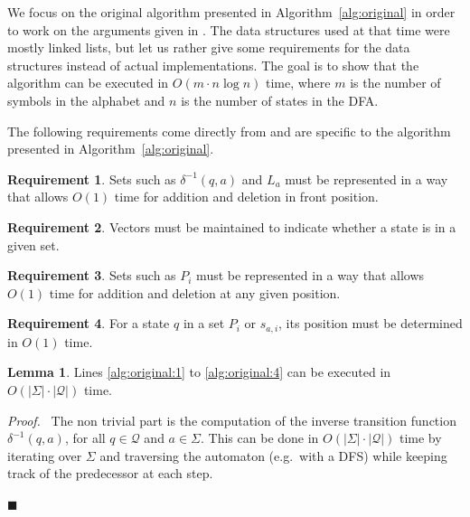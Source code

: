 \documentclass[12pt, a4 paper]{article}
\renewenvironment{proof}[1][Proof]{\begin{mdframed}[backgroundcolor=black!5, topline=false, rightline=false, bottomline=false, linecolor=black!15, linewidth=3pt]{\noindent\textit{#1.}\ }}{\noindent\par\hfill$\blacksquare$\end{mdframed}}
\theoremstyle{definition}
\newtheorem{lemma}{Lemma}
\newtheorem{requirement}{Requirement}
\begin{document}
We focus on the original algorithm presented in Algorithm~\ref{alg:original} in order to work on the arguments given in \cite{Hop71}. The data structures used at that time were mostly linked lists, but let us rather give some requirements for the data structures instead of actual implementations. The goal is to show that the algorithm can be executed in $O(m \cdot n \log n)$ time, where $m$ is the number of symbols in the alphabet and $n$ is the number of states in the DFA.

The following requirements come directly from \cite{Hop71} and are specific to the algorithm presented in Algorithm~\ref{alg:original}.

\begin{requirement}
    \label{req:1}
Sets such as $\delta^{-1}(q, a)$ and $L_a$ must be represented in a way that allows $O(1)$ time for addition and deletion in front position.
\end{requirement}

\begin{requirement}
    \label{req:2}
Vectors must be maintained to indicate whether a state is in a given set.
\end{requirement}

\begin{requirement}
    \label{req:3}
Sets such as $P_i$ must be represented in a way that allows $O(1)$ time for addition and deletion at any given position.
\end{requirement}

\begin{requirement}
    \label{req:4}
For a state $q$ in a set $P_i$ or $s_{a,i}$, its position must be determined in $O(1)$ time.
\end{requirement}

\begin{lemma}
    Lines \ref{alg:original:1} to \ref{alg:original:4} can be executed in $O(\left| \Sigma \right| \cdot \left| \mathcal{Q} \right|)$ time.
\end{lemma}
\begin{proof}
    The non trivial part is the computation of the inverse transition function $\delta^{-1}(q, a)$, for all $q \in \mathcal{Q}$ and $a \in \Sigma$. This can be done in $O(\left| \Sigma \right| \cdot \left| \mathcal{Q} \right|)$ time by iterating over $\Sigma$ and traversing the automaton (e.g.\ with a DFS) while keeping track of the predecessor at each step.
\end{proof}
\end{document}
